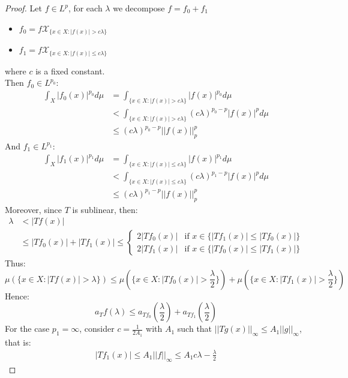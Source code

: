 \begin{proof} 
  Let $f \in L^p$, for each $\lambda$ we decompose $f = f_0 + f_1$\\
  \begin{itemize}
    \item $f_0 = f \mathcal{X}_{\{ x \in X: |f(x)| > c\lambda \}}$\\
    \item $f_1 = f \mathcal{X}_{\{ x \in X: |f(x)| \leq c\lambda \}}$
  \end{itemize}
  where $c$ is a fixed constant.\\
  Then $f_0 \in L^{p_0}$:
  \begin{align*}
    \int_X |f_0(x)|^{p_0} d\mu & = \int_{\{ x \in X: |f(x)| > c\lambda \}} |f(x)|^{p_0} d\mu\\
    & < \int_{\{ x \in X: |f(x)| > c\lambda \}} (c\lambda)^{p_0 - p}|f(x)|^{p} d\mu\\
    & \leq (c\lambda)^{p_0 - p} ||f(x)||_p^p
  \end{align*}   
  And $f_1 \in L^{p_1}$:
  \begin{align*}
    \int_X |f_1(x)|^{p_1} d\mu & = \int_{\{ x \in X: |f(x)| \leq c\lambda \}} |f(x)|^{p_1} d\mu\\
    & < \int_{\{ x \in X: |f(x)| \leq c\lambda \}} (c\lambda)^{p_1 - p}|f(x)|^{p} d\mu\\
    & \leq (c\lambda)^{p_1 - p} ||f(x)||_p^p
  \end{align*}
  Moreover, since $T$ is sublinear, then:
  \begin{align*}
    \lambda & < |Tf(x)| \\
    & \leq |Tf_0(x)| + |Tf_1(x)| \leq \begin{cases}
      2|Tf_0(x)| & \text{if } x \in \{|Tf_1(x)| \leq |Tf_0(x)|\} \\
      2|Tf_1(x)| & \text{if } x \in \{|Tf_0(x)| \leq |Tf_1(x)|\}
    \end{cases}
  \end{align*}
  Thus:
  $$\mu(\{x \in X: |Tf(x)| > \lambda\}) \leq \mu(\{x \in X: |Tf_0(x)| > \frac{\lambda}{2}\}) + \mu(\{x \in X: |Tf_1(x)| > \frac{\lambda}{2}\})$$
  Hence:
  $$a_Tf(\lambda) \leq a_{Tf_0}(\frac{\lambda}{2}) + a_{Tf_1}(\frac{\lambda}{2})$$
  For the case $p_1 = \infty$, consider $c = \frac{1}{2A_1}$ with $A_1$ such that $||Tg(x)||_{\infty} \leq A_1 ||g||_{\infty}$, that is:
  \begin{align*}
    |Tf_1(x)| \leq A_1 ||f||_{\infty} \leq A_1 c\lambda - \frac{\lambda}{2}
  \end{align*}

\end{proof}
